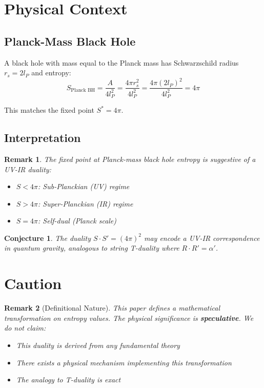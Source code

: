 \documentclass[11pt,a4paper]{article}
\newtheorem{conjecture}{Conjecture}
\newtheorem{remark}{Remark}
\begin{document}
\section{Physical Context}

\subsection{Planck-Mass Black Hole}

A black hole with mass equal to the Planck mass has Schwarzschild radius $r_s = 2l_P$ and entropy:
\begin{equation}
S_{\text{Planck BH}} = \frac{A}{4l_P^2} = \frac{4\pi r_s^2}{4l_P^2} = \frac{4\pi (2l_P)^2}{4l_P^2} = 4\pi
\end{equation}

This matches the fixed point $S^* = 4\pi$.

\subsection{Interpretation}

\begin{remark}
The fixed point at Planck-mass black hole entropy is suggestive of a UV-IR duality:
\begin{itemize}
    \item $S < 4\pi$: Sub-Planckian (UV) regime
    \item $S > 4\pi$: Super-Planckian (IR) regime
    \item $S = 4\pi$: Self-dual (Planck scale)
\end{itemize}
\end{remark}

\begin{conjecture}
The duality $S \cdot S' = (4\pi)^2$ may encode a UV-IR correspondence in quantum gravity, analogous to string T-duality where $R \cdot R' = \alpha'$.
\end{conjecture}

\section{Caution}

\begin{remark}[Definitional Nature]
This paper defines a mathematical transformation on entropy values. The physical significance is \textbf{speculative}. We do not claim:
\begin{itemize}
    \item This duality is derived from any fundamental theory
    \item There exists a physical mechanism implementing this transformation
    \item The analogy to T-duality is exact
\end{itemize}
\end{remark}
\end{document}
